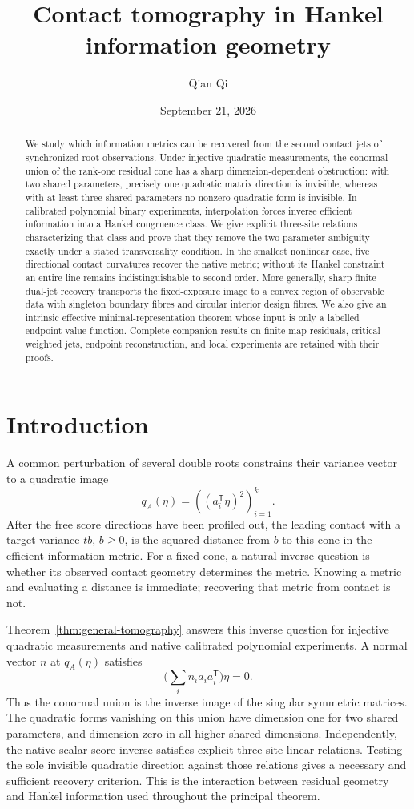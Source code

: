 \documentclass[11pt,reqno]{amsart}
\title[Contact tomography in Hankel geometry]{Contact tomography in Hankel information geometry}
\author{Qian Qi}
\date{September 21, 2026}
\numberwithin{equation}{section}
\theoremstyle{definition}
\theoremstyle{remark}
\begin{document}
\begin{abstract}
We study which information metrics can be recovered from the second contact jets of synchronized root observations. Under injective quadratic measurements, the conormal union of the rank-one residual cone has a sharp dimension-dependent obstruction: with two shared parameters, precisely one quadratic matrix direction is invisible, whereas with at least three shared parameters no nonzero quadratic form is invisible. In calibrated polynomial binary experiments, interpolation forces inverse efficient information into a Hankel congruence class. We give explicit three-site relations characterizing that class and prove that they remove the two-parameter ambiguity exactly under a stated transversality condition. In the smallest nonlinear case, five directional contact curvatures recover the native metric; without its Hankel constraint an entire line remains indistinguishable to second order. More generally, sharp finite dual-jet recovery transports the fixed-exposure image to a convex region of observable data with singleton boundary fibres and circular interior design fibres. We also give an intrinsic effective minimal-representation theorem whose input is only a labelled endpoint value function. Complete companion results on finite-map residuals, critical weighted jets, endpoint reconstruction, and local experiments are retained with their proofs.
\end{abstract}
\maketitle
\section{Introduction}
A common perturbation of several double roots constrains their variance vector to a quadratic image
\[
 q_A(\eta)=((a_i^{\mathsf T}\eta)^2)_{i=1}^k.
\]
After the free score directions have been profiled out, the leading contact with a target variance $tb$, $b\ge0$, is the squared distance from $b$ to this cone in the efficient information metric. For a fixed cone, a natural inverse question is whether its observed contact geometry determines the metric. Knowing a metric and evaluating a distance is immediate; recovering that metric from contact is not.

Theorem~\ref{thm:general-tomography} answers this inverse question for injective quadratic measurements and native calibrated polynomial experiments. A normal vector $n$ at $q_A(\eta)$ satisfies
\[
 \Big(\sum_i n_i a_i a_i^{\mathsf T}\Big)\eta=0.
\]
Thus the conormal union is the inverse image of the singular symmetric matrices. The quadratic forms vanishing on this union have dimension one for two shared parameters, and dimension zero in all higher shared dimensions. Independently, the native scalar score inverse satisfies explicit three-site linear relations. Testing the sole invisible quadratic direction against those relations gives a necessary and sufficient recovery criterion. This is the interaction between residual geometry and Hankel information used throughout the principal theorem.
\end{document}
